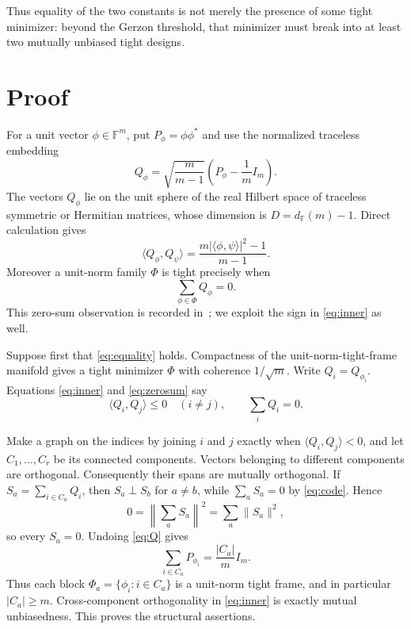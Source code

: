 \documentclass[10pt]{article}
\newcommand{\F}{\mathbb F}
\begin{document}
Thus equality of the two constants is not merely the presence of some tight
minimizer: beyond the Gerzon threshold, that minimizer must break into at
least two mutually unbiased tight designs.

\section{Proof}

For a unit vector $\phi\in\F^m$, put $P_\phi=\phi\phi^*$ and use the
normalized traceless embedding
\begin{equation}\label{eq:Q}
 Q_\phi=\sqrt{\frac{m}{m-1}}
 \left(P_\phi-\frac1mI_m\right).
\end{equation}
The vectors $Q_\phi$ lie on the unit sphere of the real Hilbert space of
traceless symmetric or Hermitian matrices, whose dimension is
$D=d_{\F}(m)-1$.  Direct calculation gives
\begin{equation}\label{eq:inner}
 \langle Q_\phi,Q_\psi\rangle
 =\frac{m|\langle\phi,\psi\rangle|^2-1}{m-1}.
\end{equation}
Moreover a unit-norm family $\Phi$ is tight precisely when
\begin{equation}\label{eq:zerosum}
 \sum_{\phi\in\Phi}Q_\phi=0.
\end{equation}
This zero-sum observation is recorded in~\cite{CH}; we exploit the sign in
\eqref{eq:inner} as well.

Suppose first that \eqref{eq:equality} holds.  Compactness of the unit-norm-tight-frame
manifold gives a tight minimizer $\Phi$ with coherence $1/\sqrt m$.  Write
$Q_i=Q_{\phi_i}$.  Equations \eqref{eq:inner} and \eqref{eq:zerosum} say
\begin{equation}\label{eq:code}
 \langle Q_i,Q_j\rangle\leq0\quad(i\ne j),
 \qquad \sum_iQ_i=0.
\end{equation}

Make a graph on the indices by joining $i$ and $j$ exactly when
$\langle Q_i,Q_j\rangle<0$, and let $C_1,\ldots,C_r$ be its connected
components.  Vectors belonging to different components are orthogonal.
Consequently their spans are mutually orthogonal.  If
$S_a=\sum_{i\in C_a}Q_i$, then $S_a\perp S_b$ for $a\ne b$, while
$\sum_aS_a=0$ by \eqref{eq:code}.  Hence
\[
 0=\left\|\sum_aS_a\right\|^2=\sum_a\|S_a\|^2,
\]
so every $S_a=0$.  Undoing \eqref{eq:Q} gives
\begin{equation}\label{eq:blocktight}
 \sum_{i\in C_a}P_{\phi_i}=\frac{|C_a|}{m}I_m.
\end{equation}
Thus each block $\Phi_a=\{\phi_i:i\in C_a\}$ is a unit-norm tight frame,
and in particular $|C_a|\geq m$.  Cross-component orthogonality in
\eqref{eq:inner} is exactly mutual unbiasedness.  This proves the structural
assertions.
\end{document}
